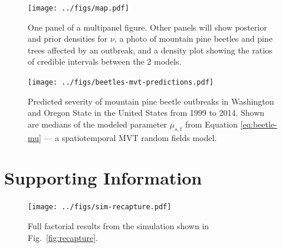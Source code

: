 \documentclass[12pt,english]{article}
\begin{document}
\begin{spacing}{1.25}
\begin{figure}[htb]
\begin{center}
  \texttt{[image: ../figs/map.pdf]}
\caption{One panel of a multipanel figure.
  Other panels will show posterior and prior densities for $\nu$,
  a photo of mountain pine beetles and pine trees affected by an outbreak,
  and a density plot showing the ratios of credible intervals between the 2 models.
}
\label{fig:map-etc}
\end{center}
\end{figure}

\clearpage

\begin{figure}[htb]
\begin{center}
  \texttt{[image: ../figs/beetles-mvt-predictions.pdf]}
\caption{Predicted severity of mountain pine beetle outbreaks in Washington and
  Oregon State in the United States from 1999 to 2014.
  Shown are medians of the modeled parameter $\mu_{s,t}$ from Equation \ref{eq:beetle-mu}
  --- a spatiotemporal MVT random fields model.
}
\label{fig:beetle-pred}
\end{center}
\end{figure}

\clearpage



\end{spacing}

\section{Supporting Information}

\renewcommand{\thefigure}{S\arabic{figure}}
\renewcommand{\thetable}{S\arabic{table}}
\setcounter{figure}{0}
\setcounter{table}{0}

\begin{figure}[htb]
\begin{center}
  \texttt{[image: ../figs/sim-recapture.pdf]}
\caption{
  Full factorial results from the simulation shown in Fig.~\ref{fig:recapture}.
}
\label{fig:recapture-factorial}
\end{center}
\end{figure}
\end{document}
